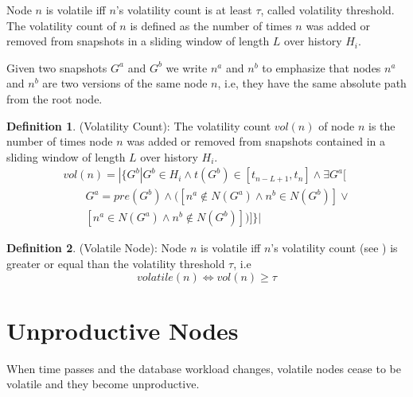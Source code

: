 \documentclass[abstracton,12pt]{scrartcl}
\theoremstyle{definition}
\newtheorem{definition}{Definition}
\begin{document}
Node $n$ is volatile iff $n$'s volatility count is at least $\tau$, called
volatility threshold. The volatility count of $n$ is defined as the number of
times $n$ was added or removed from snapshots in a sliding window of length
$L$ over history $H_i$.

Given two snapshots $G^a$ and $G^b$ we write $n^a$ and $n^b$ to emphasize that
nodes $n^a$ and $n^b$ are two versions of the same node $n$, i.e, they have
the same absolute path from the root node.

\begin{definition}
  (Volatility Count): The volatility count $vol(n)$ of node $n$ is the number of
  times node $n$ was added or removed from snapshots contained in a sliding
  window of length $L$ over history $H_i$.
  \begin{align*}
    vol(n) = | \{ G^b | G^b \in H_i \land t(G^b) \in [t_{n-L+1}, t_n] \land \exists G^a[ \\
    \qquad G^a = pre(G^b) \land ([n^a \notin N(G^a) \land n^b \in N(G^b)]\lor \\
    \qquad [n^a \in N(G^a) \land n^b \notin N(G^b)] )]\} |
  \end{align*}
  \label{def:vol_count}
\end{definition}

\begin{definition}
  (Volatile Node): Node $n$ is volatile iff $n$'s volatility count (see
  ) is greater or equal than the volatility threshold
  $\tau$, i.e
  $$ volatile(n) \iff vol(n) \geq \tau $$
  \label{def:volatile_node}
\end{definition}



\section{Unproductive Nodes}

When time passes and the database workload changes, volatile nodes cease to be
volatile and they become unproductive.
\end{document}
